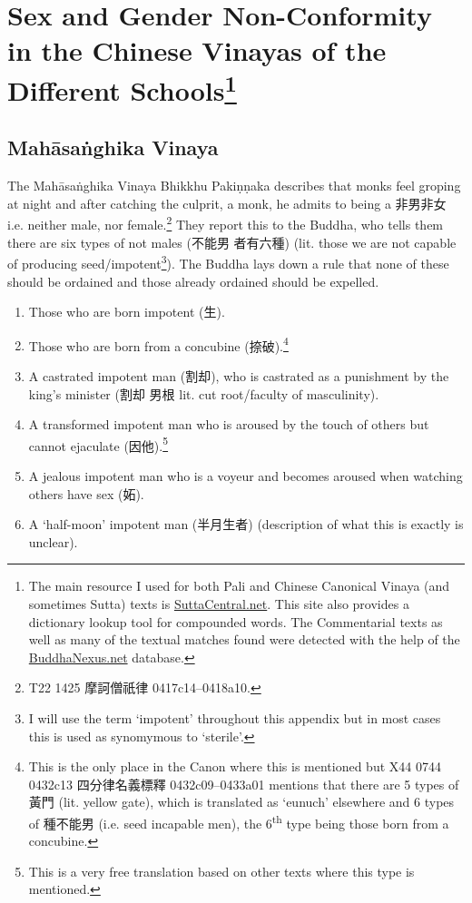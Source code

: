 \section{Sex and Gender Non-Conformity in the Chinese Vinayas of the Different Schools\footnote{The main resource I used for both Pali and Chinese Canonical Vinaya (and sometimes Sutta) texts is \href{https://suttacentral.net/}{SuttaCentral.net}. This site also provides a dictionary lookup tool for compounded words. The Commentarial texts as well as many of the textual matches found were detected with the help of the \href{https://buddhanexus.net/}{BuddhaNexus.net} database.}}
\label{appendix1}

\subsection{Mahāsaṅghika Vinaya}
The Mahāsaṅghika Vinaya Bhikkhu Pakiṇṇaka describes that monks feel groping at night and after catching the culprit, a monk, he admits to being a 非男非女 i.e. neither male, nor female.\footnote{T22 1425 摩訶僧祇律 0417c14–0418a10.} They report this to the Buddha, who tells them there are six types of not males (不能男 者有六種) (lit. those we are not capable of producing seed/impotent\footnote{I will use the term `impotent' throughout this appendix but in most cases this is used as synomymous to `sterile'.}). The Buddha lays down a rule that none of these should be ordained and those already ordained should be expelled.

\begin{enumerate}
\item Those who are born impotent (生). 
\item Those who are born from a concubine (捺破).\footnote{This is the only place in the Canon where this is mentioned but X44 0744 0432c13 四分律名義標釋 0432c09–0433a01 mentions that there are 5 types of 黃門 (lit. yellow gate), which is translated as `eunuch' elsewhere and 6 types of 種不能男 (i.e. seed incapable men), the 6\textsuperscript{th} type being those born from a concubine.}
\item A castrated impotent man (割却), who is castrated as a punishment by the king's minister (割却 男根 lit. cut root/faculty of masculinity).
\item A transformed impotent man who is aroused by the touch of others but cannot ejaculate (因他).\footnote{This is a very free translation based on other texts where this type is mentioned.}
\item A jealous impotent man who is a voyeur and becomes aroused when watching others have sex (妬).
\item A `half-moon' impotent man (半月生者) (description of what this is exactly is unclear).
\end{enumerate}

